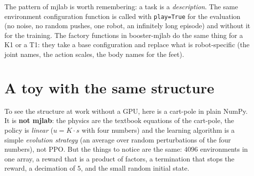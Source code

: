 \begin{aibox}
The pattern of mjlab is worth remembering: a task is a \emph{description}. The same environment configuration function is called with \verb!play=True! for the evaluation (no noise, no random pushes, one robot, an infinitely long episode) and without it for the training. The factory functions in booster-mjlab do the same thing for a K1 or a T1: they take a base configuration and replace what is robot-specific (the joint names, the action scales, the body names for the feet).
\end{aibox}

\section*{A toy with the same structure}
To see the structure at work without a GPU, here is a cart-pole in plain NumPy. It is \textbf{not mjlab}: the physics are the textbook equations of the cart-pole, the policy is \emph{linear} ($u=K\cdot s$ with four numbers) and the learning algorithm is a simple \emph{evolution strategy} (an average over random perturbations of the four numbers), not PPO. But the things to notice are the same: $4096$ environments in one array, a reward that is a product of factors, a termination that stops the reward, a decimation of $5$, and the small random initial state.

